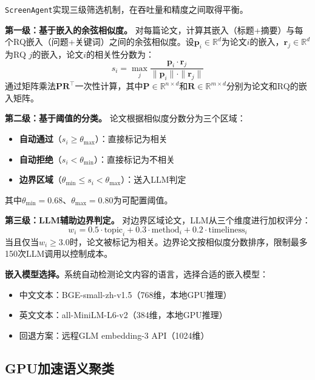 \texttt{ScreenAgent}实现三级筛选机制，在吞吐量和精度之间取得平衡。

\textbf{第一级：基于嵌入的余弦相似度。}
对每篇论文，计算其嵌入（标题+摘要）与每个RQ嵌入（问题+关键词）之间的余弦相似度。设$\mathbf{p}_i \in \mathbb{R}^d$为论文$i$的嵌入，$\mathbf{r}_j \in \mathbb{R}^d$为RQ $j$的嵌入，论文$i$的相关性分数为：
\begin{equation}
    s_i = \max_{j} \frac{\mathbf{p}_i \cdot \mathbf{r}_j}{\|\mathbf{p}_i\| \cdot \|\mathbf{r}_j\|}
    \label{eq:cosine-similarity}
\end{equation}
通过矩阵乘法$\mathbf{P} \mathbf{R}^\top$一次性计算，其中$\mathbf{P} \in \mathbb{R}^{n \times d}$和$\mathbf{R} \in \mathbb{R}^{m \times d}$分别为论文和RQ的嵌入矩阵。

\textbf{第二级：基于阈值的分类。}
论文根据相似度分数分为三个区域：
\begin{itemize}
    \item \textbf{自动通过}（$s_i \geq \theta_{\max}$）：直接标记为相关
    \item \textbf{自动拒绝}（$s_i < \theta_{\min}$）：直接标记为不相关
    \item \textbf{边界区域}（$\theta_{\min} \leq s_i < \theta_{\max}$）：送入LLM判定
\end{itemize}
其中$\theta_{\min} = 0.68$、$\theta_{\max} = 0.80$为可配置阈值。

\textbf{第三级：LLM辅助边界判定。}
对边界区域论文，LLM从三个维度进行加权评分：
\begin{equation}
    w_i = 0.5 \cdot \text{topic}_i + 0.3 \cdot \text{method}_i + 0.2 \cdot \text{timeliness}_i
    \label{eq:weighted-score}
\end{equation}
当且仅当$w_i \geq 3.0$时，论文被标记为相关。边界论文按相似度分数排序，限制最多150次LLM调用以控制成本。

\textbf{嵌入模型选择。}系统自动检测论文内容的语言，选择合适的嵌入模型：
\begin{itemize}
    \item 中文文本：BGE-small-zh-v1.5（768维，本地GPU推理）
    \item 英文文本：all-MiniLM-L6-v2（384维，本地GPU推理）
    \item 回退方案：远程GLM embedding-3 API（1024维）
\end{itemize}

\subsection{GPU加速语义聚类}
\label{sec:method-cluster}

